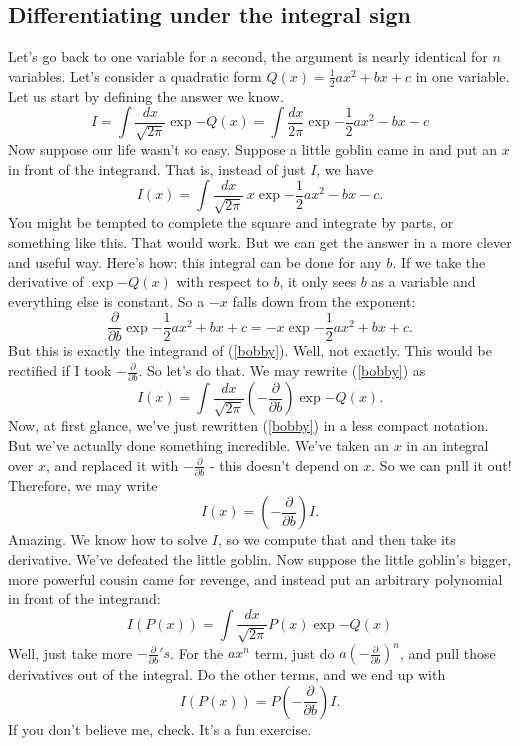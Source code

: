 \documentclass{book}
\begin{document}
\newpage
\subsection{Differentiating under the integral sign}
Let's go back to one variable for a second, the argument is nearly identical for $n$ variables. Let's consider a quadratic form $Q(x) = \frac{1}{2} ax^2 + bx + c$ in one variable. Let us start by defining the answer we know.
\[
I = \int \frac{dx}{\sqrt{2\pi}} \exp{-Q(x)} = \int \frac{dx}{2\pi} \exp{-\frac{1}{2}ax^2 - bx - c}
\]
Now suppose our life wasn't so easy. Suppose a little goblin came in and put an $x$ in front of the integrand. That is, instead of just $I$, we have
\begin{equation} \label{bobby}
I (x) = \int \frac{dx}{\sqrt{2\pi}} \, x \exp{-\frac{1}{2} a x^2 - bx - c}. 
\end{equation}
You might be tempted to complete the square and integrate by parts, or something like this. That would work. But we can get the answer in a more clever and useful way. Here's how: this integral can be done for any $b$. If we take the derivative of $\exp{-Q(x)}$ with respect to $b$, it only sees $b$ as a variable and everything else is constant. So a $-x$ falls down from the exponent:
\[
\frac{\partial}{\partial b} \exp{-\frac{1}{2}ax^2 + bx + c} = - x \exp{-\frac{1}{2} ax^2 + bx + c}.
\]
But this is exactly the integrand of (\ref{bobby}). Well, not exactly. This would be rectified if I took $-\frac{\partial}{\partial b}$. So let's do that. We may rewrite (\ref{bobby}) as 
\begin{equation}
I (x) = \int \frac{dx}{\sqrt{2\pi}} \left(-\frac{\partial}{\partial b}\right) \exp{-Q(x)}.
\end{equation}
Now, at first glance, we've just rewritten (\ref{bobby}) in a less compact notation. But we've actually done something incredible. We've taken an $x$ in an integral over $x$, and replaced it with $-\frac{\partial}{\partial b}$ - this doesn't depend on $x$. So we can pull it out! Therefore, we may write
\begin{equation} \label{amazing}
I(x) = \left( -\frac{\partial}{\partial b}\right) I.
\end{equation}
Amazing. We know how to solve $I$, so we compute that and then take its derivative. We've defeated the little goblin. Now suppose the little goblin's bigger, more powerful cousin came for revenge, and instead put an arbitrary polynomial in front of the integrand:
\[
I(P(x)) = \int \frac{dx}{\sqrt{2\pi}} P(x) \exp{-Q(x)}
\]
Well, just take more $-\frac{\partial}{\partial b}'s$. For the $a x^n$ term, just do $a (-\frac{\partial}{\partial b})^n$, and pull those derivatives out of the integral. Do the other terms, and we end up with
\[
I(P(x)) = P\left( - \frac{\partial}{\partial b} \right) I.
\]
If you don't believe me, check. It's a fun exercise.
\end{document}
